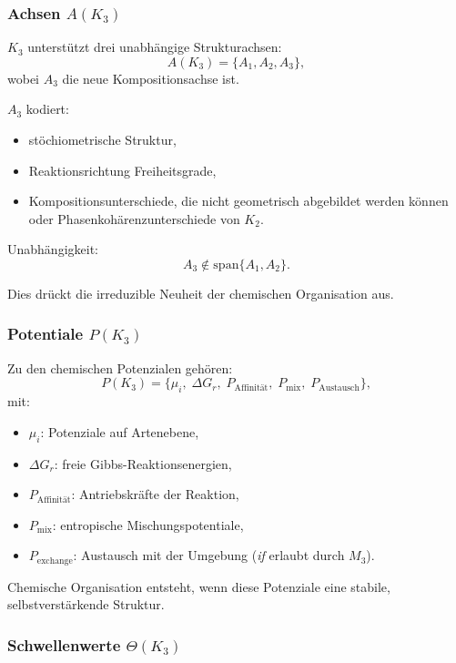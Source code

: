 \subsubsection{Achsen \texorpdfstring{$A(K_3)$}{A(K_3)}}

$K_3$ unterstützt drei unabhängige Strukturachsen:
\[
A(K_3) = \{A_1, A_2, A_3\},
\]
wobei $A_3$ die neue Kompositionsachse ist.

$A_3$ kodiert:
\begin{itemize}
    \item stöchiometrische Struktur,
    \item Reaktionsrichtung Freiheitsgrade,
    \item Kompositionsunterschiede, die nicht geometrisch abgebildet werden können
          oder Phasenkohärenzunterschiede von $K_2$.
\end{itemize}

Unabhängigkeit:
\[
A_3 \notin \mathrm{span}\{A_1,A_2\}.
\]

Dies drückt die irreduzible Neuheit der chemischen Organisation aus.

\subsubsection{Potentiale \texorpdfstring{$P(K_3)$}{P(K_3)}}

Zu den chemischen Potenzialen gehören:
\[
P(K_3) = \{ \mu_i,\; \Delta G_r,\; P_{\mathrm{Affinität}},\;
           P_{\mathrm{mix}},\; P_{\mathrm{Austausch}}\},
\]
mit:
\begin{itemize}
    \item $\mu_i$: Potenziale auf Artenebene,
    \item $\Delta G_r$: freie Gibbs-Reaktionsenergien,
    \item $P_{\mathrm{Affinität}}$: Antriebskräfte der Reaktion,
    \item $P_{\mathrm{mix}}$: entropische Mischungspotentiale,
    \item $P_{\mathrm{exchange}}$: Austausch mit der Umgebung (\emph{if}
          erlaubt durch $M_3$).
\end{itemize}

Chemische Organisation entsteht, wenn diese Potenziale eine stabile,
selbstverstärkende Struktur.

\subsubsection{Schwellenwerte \texorpdfstring{$\Theta(K_3)$}{\Theta(K_3)}}

